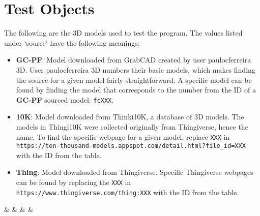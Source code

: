 \chapter{Test Objects}\label{app:model_table}

The following are the 3D models used to test the program.
The values listed under `source' have the following meanings:
\begin{itemize}
	\item \textbf{GC-PF}: Model downloaded from GrabCAD created by user paulocferreira 3D\cite{GC-PF}.
		User paulocferreira 3D numbers their basic models, which makes finding the source for a given model fairly straightforward.
		A specific model can be found by finding the model that corresponds to the number from the ID of a \textbf{GC-PF} sourced model: \verb|fcXXX|.
	\item \textbf{10K}: Model downloaded from Thinki10K, a database of 3D models\cite{Thingi10K_paper, Thingi10K_app}.
		The models in Thingi10K were collected originally from Thingiverse, hence the name.
		To find the specific webpage for a given model, replace \verb|XXX| in \verb|https://ten-thousand-models.appspot.com/detail.html?file_id=XXX| with the ID from the table.
	\item \textbf{Thing}: Model downloaded from Thingiverse.
		Specific Thingiverse webpages can be found by replacing the \verb|XXX| in \verb|https://www.thingiverse.com/thing:XXX| with the ID from the table.
\end{itemize}

 {%
	\id & \src & \mesh & \class & \outcome
}%

